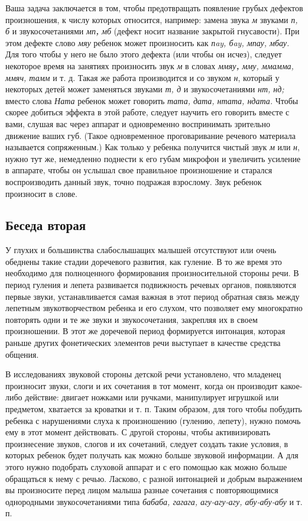 \documentclass{book}
\renewcommand{\emph}[1]{\textit{#1}}
\begin{document}
Ваша задача заключается в том, чтобы предотвращать появление грубых
дефектов произношения, к числу которых относится, например: замена звука
\emph{м} звуками \emph{п, б} и звукосочетаниями \emph{мп\textbf{,} мб}
(дефект носит название закрытой гнусавости). При этом дефекте слово
\emph{мяу} ребенок может произносить как \emph{пay, бay, мпау, мбау.}
Для того чтобы у него не было этого дефекта (или чтобы он исчез),
следует некоторое время на занятиях произносить звук \emph{м} в словах
\emph{ммяу\textbf{,} мму, ммамма, ммяч, тамм} и т. д. Такая же работа
производится и со звуком \emph{н}, который у некоторых детей может
заменяться звуками \emph{т, д} и звукосочетаниями \emph{нт, нд;} вместо
слова \emph{Ната} ребенок может говорить \emph{тата, дата, нтата,
ндата.} Чтобы скорее добиться эффекта в этой работе, следует научить его
говорить вместе с вами, слушая вас через аппарат и одновременно
воспринимать зрительно движение ваших губ. (Такое одновременное
проговаривание речевого материала называется сопряженным.) Как только у
ребенка получится чистый звук \emph{м} или \emph{н}, нужно тут же,
немедленно поднести к его губам микрофон и увеличить усиление в
аппарате, чтобы он услышал свое правильное произношение и старался
воспроизводить данный звук, точно подражая взрослому. Звук ребенок
произносит в слове.

\subsection*{Беседа вторая}

У глухих и большинства слабослышащих малышей отсутствуют или очень
обеднены такие стадии доречевого развития, как гуление. В то же время
это необходимо для полноценного формирования произносительной стороны
речи. В период гуления и лепета развивается подвижность речевых органов,
появляются первые звуки, устанавливается самая важная в этот период
обратная связь между лепетным звукотворчеством ребенка и его слухом, что
позволяет ему многократно повторять одни и те же звуки и звукосочетания,
закрепляя их в своем произношении. В этот же доречевой период
формируется интонация, которая раньше других фонетических элементов речи
выступает в качестве средства общения.

В исследованиях звуковой стороны детской речи установлено, что младенец
произносит звуки, слоги и их сочетания в тот момент, когда он производит
какое-либо действие: двигает ножками или ручками, манипулирует игрушкой
или предметом, хватается за кроватки и т. п. Таким образом, для того
чтобы побудить ребенка с нарушениями слуха к произношению (гулению,
лепету), нужно помочь ему в этот момент действовать. С другой стороны,
чтобы активизировать произнесение звуков, слогов и их сочетаний, следует
создать такие условия, в которых ребенок будет получать как можно больше
звуковой информации. А для этого нужно подобрать слуховой аппарат и с
его помощью как можно больше обращаться к нему с речью. Ласково, с
разной интонацией и добрым выражением вы произносите перед лицом малыша
разные сочетания с повторяющимися однородными звукосочетаниями типа
\emph{бабаба, гагага, агу-агу-агу, абу-абу-абу} и т. п.
\end{document}

